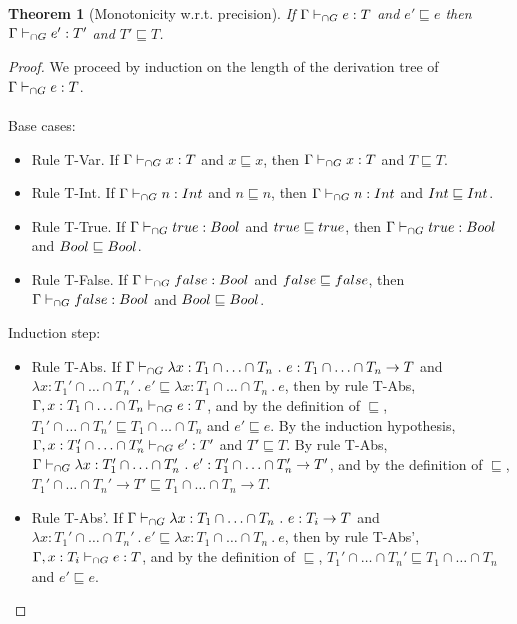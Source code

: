 \documentclass[a4paper]{article}
\newtheorem{theorem}{Theorem}[section]
\begin{document}
\begin{theorem}[Monotonicity w.r.t. precision]
\label{monotonicity_wrt_precision}
If $\Gamma \vdash_{\cap G} e : T$ and $e' \sqsubseteq e$ then $\Gamma \vdash_{\cap G} e' : T'$ and $T' \sqsubseteq T$.
\end{theorem}
\begin{proof}
We proceed by induction on the length of the derivation tree of $\Gamma \vdash_{\cap G} e : T$.\\\\
Base cases:
\begin{itemize}
    \item Rule T-Var.
    If $\Gamma \vdash_{\cap G} x : T$ and $x \sqsubseteq x$, then $\Gamma \vdash_{\cap G} x : T$ and $T \sqsubseteq T$.
    \item Rule T-Int.
    If $\Gamma \vdash_{\cap G} n : {Int}$ and $n \sqsubseteq n$, then $\Gamma \vdash_{\cap G} n : {Int}$ and ${Int} \sqsubseteq {\ensuremath{Int}}$.
    \item Rule T-True.
    If $\Gamma \vdash_{\cap G} true : Bool$ and $true \sqsubseteq true$, then $\Gamma \vdash_{\cap G} true : Bool$ and $Bool \sqsubseteq Bool$.
    \item Rule T-False.
    If $\Gamma \vdash_{\cap G} false : Bool$ and $false \sqsubseteq false$, then $\Gamma \vdash_{\cap G} false : Bool$ and $Bool \sqsubseteq Bool$.
\end{itemize}
Induction step:
\begin{itemize}
    \item Rule T-Abs.
    If $\Gamma \vdash_{\cap G} \lambda x : T_1 \cap \ldots \cap T_n\ .\ e : T_1 \cap \ldots \cap T_n \rightarrow T$ and $\lambda x : T_1' \cap \ldots \cap T_n'\ .\ e' \sqsubseteq \lambda x : T_1 \cap \ldots \cap T_n\ .\ e$, then by rule T-Abs, $\Gamma, x : T_1 \cap \ldots \cap T_n \vdash_{\cap G} e : T$, and by the definition of $\sqsubseteq$, $T_1' \cap \ldots \cap T_n' \sqsubseteq T_1 \cap \ldots \cap T_n$ and $e' \sqsubseteq e$.
    By the induction hypothesis, $\Gamma, x : T_1' \cap \ldots \cap T_n' \vdash_{\cap G} e' : T'$ and $T' \sqsubseteq T$.
    By rule T-Abs, $\Gamma \vdash_{\cap G} \lambda x : T_1' \cap \ldots \cap T_n'\ .\ e' : T_1' \cap \ldots \cap T_n' \rightarrow T'$, and by the definition of $\sqsubseteq$, $T_1' \cap \ldots \cap T_n' \rightarrow T' \sqsubseteq T_1 \cap \ldots \cap T_n \rightarrow T$.
    \item Rule T-Abs'.
    If $\Gamma \vdash_{\cap G} \lambda x : T_1 \cap \ldots \cap T_n\ .\ e : T_i \rightarrow T$ and $\lambda x : T_1' \cap \ldots \cap T_n'\ .\ e' \sqsubseteq \lambda x : T_1 \cap \ldots \cap T_n\ .\ e$, then by rule T-Abs', $\Gamma, x : T_i \vdash_{\cap G} e : T$, and by the definition of $\sqsubseteq$, $T_1' \cap \ldots \cap T_n' \sqsubseteq T_1 \cap \ldots \cap T_n$ and $e' \sqsubseteq e$.

\end{itemize}
\end{proof}
\end{document}
